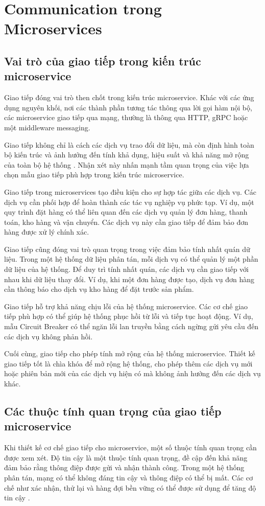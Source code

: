 \section{Communication trong Microservices}

\subsection{Vai trò của giao tiếp trong kiến trúc microservice}
Giao tiếp đóng vai trò then chốt trong kiến trúc microservice. Khác với các ứng
dụng nguyên khối, nơi các thành phần tương tác thông qua lời gọi hàm nội bộ,
các microservice giao tiếp qua mạng, thường là thông qua HTTP, gRPC hoặc một
middleware messaging.

Giao tiếp không chỉ là cách các dịch vụ trao đổi dữ liệu, mà còn định hình toàn bộ kiến trúc và ảnh hưởng đến tính khả dụng, hiệu suất và khả năng mở rộng của toàn bộ hệ thống \cite{wolff2016}. Nhận xét này nhấn mạnh tầm quan trọng của việc lựa chọn mẫu giao tiếp phù hợp trong kiến trúc microservice.

Giao tiếp trong microservices tạo điều kiện cho sự hợp tác giữa các dịch vụ.
Các dịch vụ cần phối hợp để hoàn thành các tác vụ nghiệp vụ phức tạp. Ví dụ,
một quy trình đặt hàng có thể liên quan đến các dịch vụ quản lý đơn hàng, thanh
toán, kho hàng và vận chuyển. Các dịch vụ này cần giao tiếp để đảm bảo đơn hàng
được xử lý chính xác.

Giao tiếp cũng đóng vai trò quan trọng trong việc đảm bảo tính nhất quán dữ
liệu. Trong một hệ thống dữ liệu phân tán, mỗi dịch vụ có thể quản lý một phần
dữ liệu của hệ thống. Để duy trì tính nhất quán, các dịch vụ cần giao tiếp với
nhau khi dữ liệu thay đổi. Ví dụ, khi một đơn hàng được tạo, dịch vụ đơn hàng
cần thông báo cho dịch vụ kho hàng để đặt trước sản phẩm.

Giao tiếp hỗ trợ khả năng chịu lỗi của hệ thống microservice. Các cơ chế giao
tiếp phù hợp có thể giúp hệ thống phục hồi từ lỗi và tiếp tục hoạt động. Ví dụ,
mẫu Circuit Breaker có thể ngăn lỗi lan truyền bằng cách ngừng gửi yêu cầu đến
các dịch vụ không phản hồi.

Cuối cùng, giao tiếp cho phép tính mở rộng của hệ thống microservice. Thiết kế
giao tiếp tốt là chìa khóa để mở rộng hệ thống, cho phép thêm các dịch vụ mới
hoặc phiên bản mới của các dịch vụ hiện có mà không ảnh hưởng đến các dịch vụ
khác.

\subsection{Các thuộc tính quan trọng của giao tiếp microservice}
Khi thiết kế cơ chế giao tiếp cho microservice, một số thuộc tính quan trọng
cần được xem xét. Độ tin cậy là một thuộc tính quan trọng, đề cập đến khả năng
đảm bảo rằng thông điệp được gửi và nhận thành công. Trong một hệ thống phân
tán, mạng có thể không đáng tin cậy và thông điệp có thể bị mất. Các cơ chế như
xác nhận, thử lại và hàng đợi bền vững có thể được sử dụng để tăng độ tin cậy \cite{hohpe2004}.

